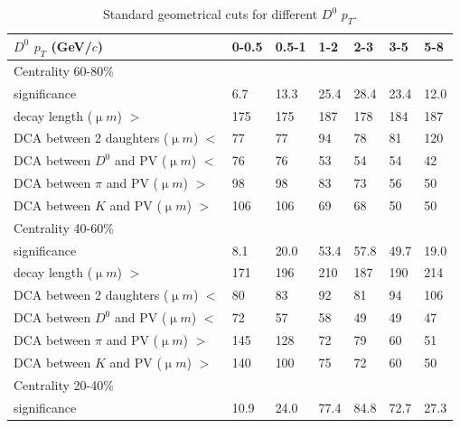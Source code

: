 \begin{table}[htp]
  \centering
  \caption{Standard geometrical cuts for different $D^0$ $p_T$.}
  \label{geometryCuts}
  \begin{center}
    \begin{tabular}{l|l|l|l|l|l|l}
      $D^0$ $p_T$ (GeV/$c$) & 0-0.5 & 0.5-1 & 1-2 & 2-3 & 3-5 & 5-8\\ \hline
      Centrality  60-80\% & &  & &  & & \\ \hline
      significance & 6.7 & 13.3 & 25.4 & 28.4 & 23.4 & 12.0\\ \hline
      decay length (${\upmu}m$) $>$ & 175 & 175 & 187 & 178 & 184 & 187\\ \hline
      DCA between 2 daughters (${\upmu}m$) $<$ & 77 & 77 & 94 & 78 & 81 & 120\\ \hline
      DCA between $D^0$ and PV (${\upmu}m$) $<$ & 76 & 76 & 53 & 54 & 54 & 42\\ \hline
      DCA between $\pi$ and PV (${\upmu}m$) $>$ & 98 & 98 & 83 & 73 & 56 & 50\\ \hline
      DCA between $K$ and PV (${\upmu}m$) $>$ & 106 & 106 & 69 & 68 & 50 & 50\\ \hline
      Centrality  40-60\% &  &  &  &  & & \\ \hline
      significance & 8.1 & 20.0 & 53.4 & 57.8 & 49.7 & 19.0\\ \hline
      decay length (${\upmu}m$) $>$ & 171 & 196 & 210 & 187 & 190 & 214\\ \hline
      DCA between 2 daughters (${\upmu}m$) $<$ & 80 & 83 & 92 & 81 & 94 & 106\\ \hline
      DCA between $D^0$ and PV (${\upmu}m$) $<$ & 72 & 57 & 58 & 49 & 49 & 47\\ \hline
      DCA between $\pi$ and PV (${\upmu}m$) $>$ & 145 & 128 & 72 & 79 & 60 & 51\\ \hline
      DCA between $K$ and PV (${\upmu}m$) $>$ & 140 & 100 & 75 & 72 & 60 & 50\\ \hline
      Centrality  20-40\% &  &  &  &  & & \\ \hline
      significance & 10.9 & 24.0 & 77.4 & 84.8 & 72.7 & 27.3\\ \hline

\end{tabular}
\end{center}
\end{table}
